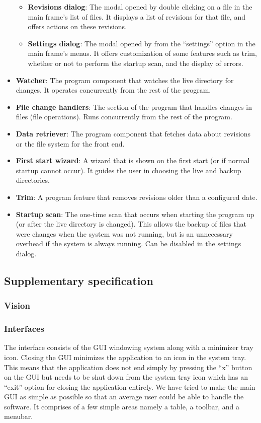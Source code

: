 \documentclass[12pt,a4paper]{article}
\newcommand\todonote[1]{{\color{red}\fbox{\parbox{\dimexpr\linewidth-2\fboxsep-2\fboxrule}{\textit\large{\textbf{TODO: #1}}}}}}
\begin{document}
\begin{itemize}
\begin{itemize}
	\item \textbf{Revisions dialog}: The modal opened by double clicking on a file in the main frame's list of files. It displays a list of revisions for that file, and offers actions on these revisions.
	\item \textbf{Settings dialog}: The modal opened by from the ``settings'' option in the main frame's menus. It offers customization of some features such as trim, whether or not to perform the startup scan, and the display of errors.
	\end{itemize}
\item \textbf{Watcher}: The program component that watches the live directory for changes. It operates concurrently from the rest of the program.
\item \textbf{File change handlers}: The section of the program that handles changes in files (file operations). Runs concurrently from the rest of the program.
\item \textbf{Data retriever}: The program component that fetches data about revisions or the file system for the front end.
\item \textbf{First start wizard}: A wizard that is shown on the first start (or if normal startup cannot occur). It guides the user in choosing the live and backup directories.
\item \textbf{Trim}: A program feature that removes revisions older than a configured date.
\item \textbf{Startup scan}: The one-time scan that occurs when starting the program up (or after the live directory is changed). This allows the backup of files that were changes when the system was not running, but is an unnecessary overhead if the system is always running. Can be disabled in the settings dialog.
\end{itemize}

\subsection{Supplementary specification}
\subsubsection{Vision}
\todonote{Butler. Adapt from M4.}

\subsubsection{Interfaces}
The interface consists of the GUI windowing system along with a minimizer tray icon. Closing the GUI minimizes the application to an icon in the system tray. This means that the application does not end simply by pressing the “x” button on the GUI but needs to be shut down from the system tray icon which has an “exit” option for closing the application entirely. We have tried to make the main GUI as simple as possible so that an average user could be able to handle the software. It comprises of a few simple areas namely a table, a toolbar, and a menubar. 
\end{document}

